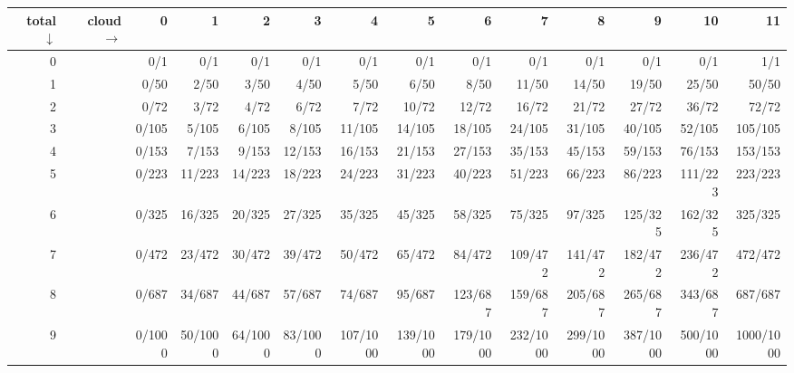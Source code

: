 \begin{tabular}{rrrrrrrrrrrrrr}
\hline
   total $\downarrow$ &   cloud $\rightarrow$ &      0 &       1 &       2 &       3 &        4 &        5 &        6 &        7 &        8 &        9 &       10 &        11 \\
\hline
                    0 &                       &    0/1 &     0/1 &     0/1 &     0/1 &      0/1 &      0/1 &      0/1 &      0/1 &      0/1 &      0/1 &      0/1 &       1/1 \\
                    1 &                       &   0/50 &    2/50 &    3/50 &    4/50 &     5/50 &     6/50 &     8/50 &    11/50 &    14/50 &    19/50 &    25/50 &     50/50 \\
                    2 &                       &   0/72 &    3/72 &    4/72 &    6/72 &     7/72 &    10/72 &    12/72 &    16/72 &    21/72 &    27/72 &    36/72 &     72/72 \\
                    3 &                       &  0/105 &   5/105 &   6/105 &   8/105 &   11/105 &   14/105 &   18/105 &   24/105 &   31/105 &   40/105 &   52/105 &   105/105 \\
                    4 &                       &  0/153 &   7/153 &   9/153 &  12/153 &   16/153 &   21/153 &   27/153 &   35/153 &   45/153 &   59/153 &   76/153 &   153/153 \\
                    5 &                       &  0/223 &  11/223 &  14/223 &  18/223 &   24/223 &   31/223 &   40/223 &   51/223 &   66/223 &   86/223 &  111/223 &   223/223 \\
                    6 &                       &  0/325 &  16/325 &  20/325 &  27/325 &   35/325 &   45/325 &   58/325 &   75/325 &   97/325 &  125/325 &  162/325 &   325/325 \\
                    7 &                       &  0/472 &  23/472 &  30/472 &  39/472 &   50/472 &   65/472 &   84/472 &  109/472 &  141/472 &  182/472 &  236/472 &   472/472 \\
                    8 &                       &  0/687 &  34/687 &  44/687 &  57/687 &   74/687 &   95/687 &  123/687 &  159/687 &  205/687 &  265/687 &  343/687 &   687/687 \\
                    9 &                       & 0/1000 & 50/1000 & 64/1000 & 83/1000 & 107/1000 & 139/1000 & 179/1000 & 232/1000 & 299/1000 & 387/1000 & 500/1000 & 1000/1000 \\
\hline
\end{tabular}
